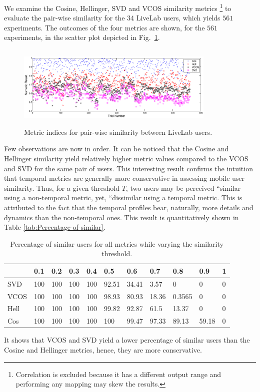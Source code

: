 \documentclass{elsarticle}
\providecommand{\tabularnewline}{\\}
\begin{document}
We examine the Cosine, Hellinger, SVD and VCOS similarity metrics%
\footnote{Correlation is excluded because it has a different output range and
performing any mapping may skew the results. %
} to evaluate the pair-wise similarity for the $34$ LiveLab users,
which yields $561$ experiments. The outcomes of the four metrics
are shown, for the $561$ experiments, in the scatter plot depicted
in Fig.~\ref{fig:scatter}.
\begin{figure}[!bp]


\raggedright{}\centerline{\includegraphics[width=9.5cm,height=4cm]{all}}
\vspace{-0.5cm}
 \caption{Metric indices for pair-wise similarity between LiveLab users.\label{fig:scatter}}
\end{figure}
 Few observations are now in order. It can be noticed that the Cosine
and Hellinger similarity yield relatively higher metric values compared
to the VCOS and SVD for the same pair of users. This interesting result
confirms the intuition that temporal metrics are generally \textquotedbl{}more
conservative\textquotedbl{} in assessing mobile user similarity. Thus,
for a given threshold $T$, two users may be perceived ``similar\textquotedbl{}
using a non-temporal metric, yet, ``dissimilar\textquotedbl{} using
a temporal metric. This is attributed to the fact that the temporal
profiles bear, naturally, more details and dynamics than the non-temporal
ones. This result is quantitatively shown in Table \ref{tab:Percentage-of-similar}.
\begin{table}
\tabcolsep=0.05cm \caption{Percentage of similar users for all metrics while varying the similarity
threshold.\label{tab:Percentage-of-similar}}


\centering{}{} \label{tab:NonAndTemporal-Maj} %
\begin{tabular}{|l|l|l|l|l|l|l|l|l|l|l|}
\hline 
 & 0.1 & 0.2  & 0.3  & 0.4  & 0.5  & 0.6  & 0.7  & 0.8  & 0.9  & 1\tabularnewline
\hline 
SVD  & 100  & 100  & 100  & 100  & 92.51  & 34.41  & 3.57  & 0  & 0  & 0\tabularnewline
\hline 
VCOS & 100  & 100  & 100  & 100  & 98.93  & 80.93  & 18.36  & 0.3565  & 0  & 0\tabularnewline
\hline 
Hell & 100  & 100  & 100  & 100  & 99.82  & 92.87  & 61.5  & 13.37  & 0  & 0\tabularnewline
\hline 
Cos & 100  & 100  & 100  & 100  & 100  & 99.47  & 97.33  & 89.13  & 59.18  & 0\tabularnewline
\hline 
\end{tabular}
\end{table}
 It shows that VCOS and SVD yield a lower percentage of similar users
than the Cosine and Hellinger metrics, hence, they are more conservative. 
\end{document}
